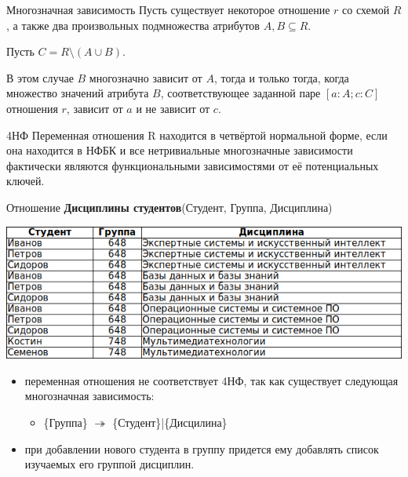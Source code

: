 \documentclass{beamer}
\begin{document}
\begin{frame}
\begin{block}{Многозначная зависимость}
Пусть существует некоторое отношение $r$ со схемой $R$, а также два произвольных подмножества атрибутов $A,B\subseteq R$. 

Пусть $C = R \setminus (A\cup B)$.

В этом случае $B$ многозначно зависит от $A$, тогда и только тогда, когда множество значений атрибута $B$, соответствующее заданной паре $[a:A;c:C]$ отношения $r$, зависит от $a$ и не зависит от $c$. 
\end{block}
\begin{block}{4НФ}
Переменная отношения R находится в четвёртой нормальной форме, если она находится в НФБК и все нетривиальные многозначные зависимости фактически являются функциональными зависимостями от её потенциальных ключей. 
\end{block}
\end{frame}

\begin{frame}
Отношение \textbf{Дисциплины студентов}(Студент, Группа, Дисциплина)
\begin{center}
\includegraphics[scale=1.5]{images/ex-rasp-11.png}
\end{center}
\begin{itemize}
\item переменная отношения не соответствует 4НФ, так как существует следующая многозначная зависимость: 
\begin{itemize}
\item  \{Группа\} $\twoheadrightarrow$ \{Студент\}|\{Дисцилина\}
\end{itemize}
\item при добавлении нового студента в группу придется ему добавлять список изучаемых его группой дисциплин.
\end{itemize}
\end{frame}
\end{document}
